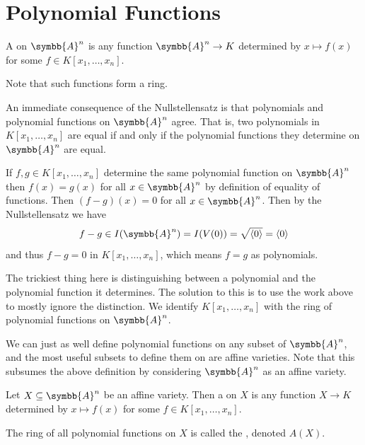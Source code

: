 \documentclass[fleqn]{NotesClass}
\newcommand{\affine}{\symbb{A}}
\begin{document}
    \section{Polynomial Functions}
    \begin{dfn}{}{}
        A  on \(\affine^n\) is any function \(\affine^n \to K\) determined by \(x \mapsto f(x)\) for some \(f \in K[x_1, \dotsc, x_n]\).
    \end{dfn}
    
    Note that such functions form a ring.
    
    An immediate consequence of the Nullstellensatz is that polynomials and polynomial functions on \(\affine^n\) agree.
    That is, two polynomials in \(K[x_1, \dotsc, x_n]\) are equal if and only if the polynomial functions they determine on \(\affine^n\) are equal.
    
    If \(f, g \in K[x_1, \dotsc, x_n]\) determine the same polynomial function on \(\affine^n\) then \(f(x) = g(x)\) for all \(x \in \affine^n\) by definition of equality of functions.
    Then \((f - g)(x) = 0\) for all \(x \in \affine^n\).
    Then by the Nullstellensatz we have
    \begin{equation}
        f - g \in I(\affine^n) = I(V(0)) = \sqrt{\langle 0 \rangle} = \langle 0 \rangle
    \end{equation}
    and thus \(f - g = 0\) in \(K[x_1, \dotsc, x_n]\), which means \(f = g\) as polynomials.
    
    The trickiest thing here is distinguishing between a polynomial and the polynomial function it determines.
    The solution to this is to use the work above to mostly ignore the distinction.
    We identify \(K[x_1, \dotsc, x_n]\) with the ring of polynomial functions on \(\affine^n\).
    
    We can just as well define polynomial functions on any subset of \(\affine^n\), and the most useful subsets to define them on are affine varieties.
    Note that this subsumes the above definition by considering \(\affine^n\) as an affine variety.
    
    \begin{dfn}{}{}
        Let \(X \subseteq \affine^n\) be an affine variety.
        Then a  on \(X\) is any function \(X \to K\) determined by \(x \mapsto f(x)\) for some \(f \in K[x_1, \dotsc, x_n]\).
        
        The ring of all polynomial functions on \(X\) is called the , denoted \(A(X)\).
    \end{dfn}
    
\end{document}
